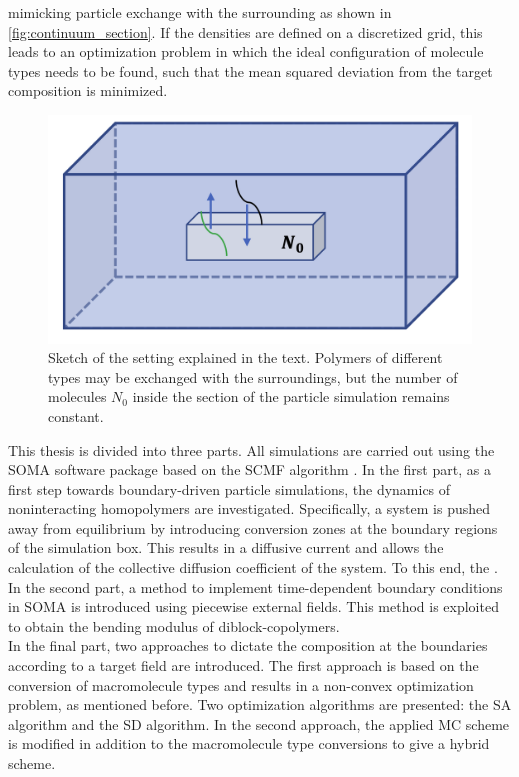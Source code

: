 \documentclass[bachelor,       %
               oneside,        %
               BCOR10mm,       %
               ngerman, english %
               ]{GAUBM}
\begin{document}
mimicking particle exchange with the surrounding as shown in \autoref{fig:continuum_section}. If the densities are defined on a discretized grid, this leads to an optimization problem in which the ideal configuration of molecule types needs to be found, such that the mean squared deviation from the target composition is minimized. \\
\begin{figure}[h]
    \centering
    \includegraphics[width=0.5\linewidth]{figures/continuum_section.png}
    \caption{Sketch of the setting explained in the text. Polymers of different types may be exchanged with the surroundings, but the number of molecules $N_0$ inside the section of the particle simulation remains constant.}
    \label{fig:continuum_section}
  \end{figure}
This thesis is divided into three parts. All simulations are carried out using the \ac{SOMA} \cite{Schneider_soma} software package based on the \ac{SCMF} algorithm \cite{Daoulas06}. In the first part, as a first step towards boundary-driven particle simulations, the dynamics of noninteracting homopolymers are investigated. Specifically, a system is pushed away from equilibrium by introducing conversion zones at the boundary regions of the simulation box. This results in a diffusive current and allows the calculation of the collective diffusion coefficient of the system. To this end, the .\\
In the second part, a method to implement time-dependent boundary conditions in \ac{SOMA} is introduced using piecewise external fields. This method is exploited to obtain the bending modulus of diblock-copolymers.\\
In the final part, two approaches to dictate the composition at the boundaries according to a target field are introduced. The first approach is based on the conversion of macromolecule types and results in a non-convex optimization problem, as mentioned before. Two optimization algorithms are presented: the \ac{SA} algorithm and the \ac{SD} algorithm. In the second approach, the applied \ac{MC} scheme is modified in addition to the macromolecule type conversions to give a hybrid scheme. 
\end{document}
